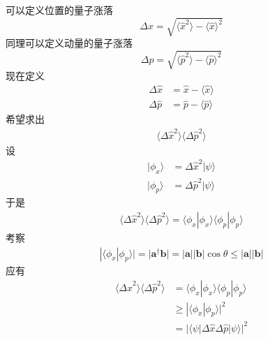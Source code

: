         可以定义位置的量子涨落
        \begin{equation}
            \Delta x = \sqrt{\langle \hat{x}^2 \rangle - \langle \hat{x} \rangle^2}
        \end{equation}
        同理可以定义动量的量子涨落
        \begin{equation}
            \Delta p = \sqrt{\langle \hat{p}^2 \rangle - \langle \hat{p} \rangle^2}
        \end{equation}
        现在定义 
        \begin{equation}\begin{aligned}
            \Delta \hat{x} &= \hat{x} - \langle \hat{x} \rangle \\
            \Delta \hat{p} &= \hat{p} - \langle \hat{p} \rangle
        \end{aligned}\end{equation}
        希望求出
        \begin{equation}\begin{aligned}
            \langle \Delta \hat{x}^2\rangle\langle \Delta \hat{p}^2\rangle
        \end{aligned}\end{equation}
        设
        \begin{equation}\begin{aligned}
            |\phi_x \rangle &= \Delta \hat{x}^2|\psi\rangle\\
            |\phi_p \rangle &= \Delta \hat{p}^2|\psi\rangle
        \end{aligned}\end{equation}
        于是 
        \begin{equation}\begin{aligned}
            \langle \Delta \hat{x}^2\rangle\langle \Delta \hat{p}^2\rangle = \langle \phi_x | \phi_x \rangle \langle \phi_p | \phi_p \rangle
        \end{aligned}\end{equation}
        考察
        \begin{equation}\begin{aligned}
            |\langle \phi_x | \phi_p \rangle| = |\bm{a}^\dagger \bm{b}| = |\bm{a}||\bm{b}|\cos{\theta} \leqslant |\bm{a}||\bm{b}|
        \end{aligned}\end{equation}
        应有
        \begin{equation}\begin{aligned}
            \langle \Delta \hat{x}^2\rangle\langle \Delta \hat{p}^2\rangle &= \langle \phi_x | \phi_x \rangle \langle \phi_p | \phi_p \rangle\\ &\geqslant |\langle \phi_x|\phi_p \rangle|^2\\
            &= |\langle \psi |\Delta \hat{x} \Delta \hat{p}|\psi \rangle|^2
        \end{aligned}\end{equation}
